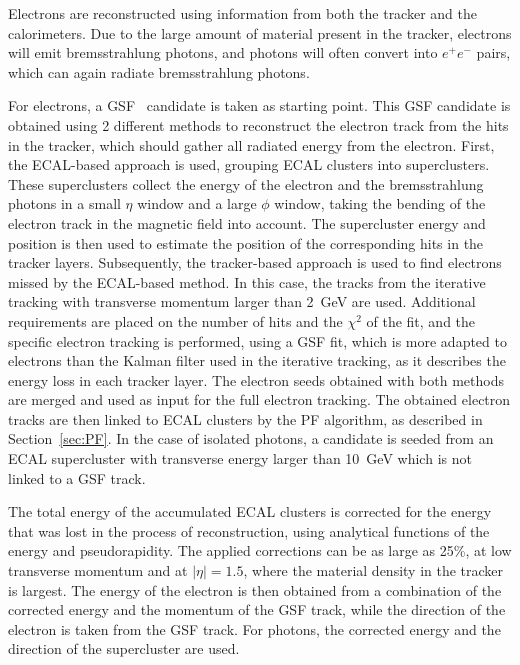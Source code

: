 Electrons are reconstructed using information from both the tracker and the calorimeters. Due to the large amount of material present in the tracker, electrons will emit bremsstrahlung photons, and photons will often convert into $e^+e^-$ pairs, which can again radiate bremsstrahlung photons.

For electrons, a \ac{GSF}~\cite{Strandlie:2006gi} candidate is taken as starting point. This \ac{GSF} candidate is obtained using 2 different methods to reconstruct the electron track from the hits in the tracker, which should gather all radiated energy from the electron. First, the ECAL-based approach is used, grouping \ac{ECAL} clusters into superclusters. These superclusters collect the energy of the electron and the bremsstrahlung photons in a small $\eta$ window and a large $\phi$ window, taking the bending of the electron track in the magnetic field into account. The supercluster energy and position is then used to estimate the position of the corresponding hits in the tracker layers. Subsequently, the tracker-based approach is used to find electrons missed by the ECAL-based method. In this case, the tracks from the iterative tracking with transverse momentum larger than \SI{2}{GeV} are used. Additional requirements are placed on the number of hits and the $\chi^2$ of the fit, and the specific electron tracking is performed, using a \ac{GSF} fit, which is more adapted to electrons than the Kalman filter used in the iterative tracking, as it describes the energy loss in each tracker layer. The electron seeds obtained with both methods are merged and used as input for the full electron tracking. The obtained electron tracks are then linked to \ac{ECAL} clusters by the \ac{PF} algorithm, as described in Section~\ref{sec:PF}. In the case of isolated photons, a candidate is seeded from an \ac{ECAL} supercluster with transverse energy larger than \SI{10}{GeV} which is not linked to a \ac{GSF} track.

The total energy of the accumulated \ac{ECAL} clusters is corrected for the energy that was lost in the process of reconstruction, using analytical functions of the energy and pseudorapidity. The applied corrections can be as large as 25\%, at low transverse momentum and at $|\eta| = 1.5$, where the material density in the tracker is largest. The energy of the electron is then obtained from a combination of the corrected energy and the momentum of the \ac{GSF} track, while the direction of the electron is taken from the \ac{GSF} track. For photons, the corrected energy and the direction of the supercluster are used.

